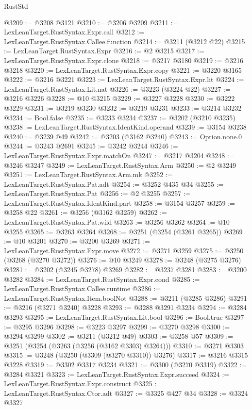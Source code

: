 \begin{lexlean}{RustStd}
\begin{coremodule}
@3209 := @3208 @3121
@3210 := @3206 @3209
@3211 := LexLeanTarget.RustSyntax.Expr.call
@3212 := LexLeanTarget.RustSyntax.Callee.function
@3214 := @3211 (@3212 @22)
@3215 := LexLeanTarget.RustSyntax.Expr
@3216 := @2 @3215
@3217 := LexLeanTarget.RustSyntax.Expr.clone
@3218 := @3217 @3180
@3219 := @3216 @3218
@3220 := LexLeanTarget.RustSyntax.Expr.copy
@3221 := @3220 @3165
@3222 := @3216 @3221
@3223 := LexLeanTarget.RustSyntax.Expr.lit
@3224 := LexLeanTarget.RustSyntax.Lit.nat
@3226 := @3223 (@3224 @22)
@3227 := @3216 @3226
@3228 := @10 @3215
@3229 := @3227 @3228
@3230 := @3222 @3229
@3231 := @3219 @3230
@3232 := @3219 @3231
@3233 := @3214 @3232
@3234 := Bool.false
@3235 := @3233 @3234
@3237 := @3202 (@3210 @3235)
@3238 := LexLeanTarget.RustSyntax.IdentKind.operand
@3239 := @3154 @3238
@3240 := @3239 @49
@3242 := @3203 (@3162 @3240)
@3243 := Option.none.{0}
@3244 := @3243 @2691
@3245 := @3242 @3244
@3246 := LexLeanTarget.RustSyntax.Expr.matchOn
@3247 := @3217 @3204
@3248 := @3246 @3247
@3249 := LexLeanTarget.RustSyntax.Arm
@3250 := @2 @3249
@3251 := LexLeanTarget.RustSyntax.Arm.mk
@3252 := LexLeanTarget.RustSyntax.Pat.adt
@3254 := @3252 @435 @34
@3255 := LexLeanTarget.RustSyntax.Pat
@3256 := @2 @3255
@3257 := LexLeanTarget.RustSyntax.IdentKind.part
@3258 := @3154 @3257
@3259 := @3258 @22
@3261 := @3256 (@3162 @3259)
@3262 := LexLeanTarget.RustSyntax.Pat.wild
@3263 := @3256 @3262
@3264 := @10 @3255
@3265 := @3263 @3264
@3268 := @3251 (@3254 (@3261 @3265))
@3269 := @10 @3201
@3270 := @3200 @3269
@3271 := LexLeanTarget.RustSyntax.Expr.move
@3272 := @3271 @3259
@3275 := @3250 (@3268 (@3270 @3272))
@3276 := @10 @3249
@3278 := @3248 (@3275 @3276)
@3281 := @3202 (@3245 @3278) @3269
@3282 := @3237 @3281
@3283 := @3200 @3282
@3284 := LexLeanTarget.RustSyntax.Expr.cond
@3285 := LexLeanTarget.RustSyntax.Callee.runtime
@3286 := LexLeanTarget.RustSyntax.Item.boolNot
@3288 := @3211 (@3285 @3286)
@3291 := @3216 (@3271 @3240) @3228
@3293 := @3288 @3291 @3234
@3294 := @3284 @3293
@3295 := LexLeanTarget.RustSyntax.Lit.bool
@3296 := Bool.true
@3297 := @3295 @3296
@3298 := @3223 @3297
@3299 := @3270 @3298
@3300 := @3294 @3299
@3302 := @3211 (@3212 @49)
@3303 := @3258 @57
@3309 := @3251 (@3254 (@3263 (@3256 (@3162 @3303) @3264)))
@3310 := @3271 @3303
@3315 := @3248 (@3250 (@3309 (@3270 @3310)) @3276)
@3317 := @3216 @3315 @3228
@3319 := @3302 @3317 @3234
@3321 := @3300 (@3270 @3319)
@3322 := @3284 @3321
@3323 := LexLeanTarget.RustSyntax.Expr.succeed
@3324 := LexLeanTarget.RustSyntax.Expr.construct
@3325 := LexLeanTarget.RustSyntax.Ctor.adt
@3327 := @3325 @427 @34
@3328 := @3324 @3327

\end{coremodule}
\end{lexlean}
